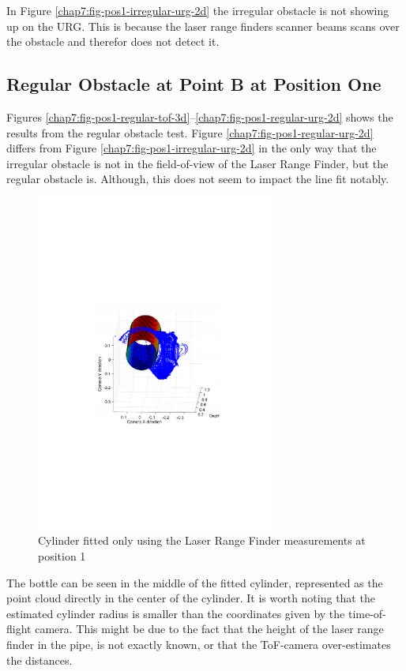 In Figure \ref{chap7:fig-pos1-irregular-urg-2d} the irregular obstacle is not showing up
on the URG. This is because the laser range finders scanner beams scans over the obstacle
and therefor does not detect it. 


\subsection{Regular Obstacle at Point B at Position One}
Figures \ref{chap7:fig-pos1-regular-tof-3d}--\ref{chap7:fig-pos1-regular-urg-2d} shows the
results from the regular obstacle test. Figure \ref{chap7:fig-pos1-regular-urg-2d} differs
from Figure \ref{chap7:fig-pos1-irregular-urg-2d} in the only way that the irregular
obstacle is not in the field-of-view of the Laser Range Finder, but the regular obstacle
is. Although, this does not seem to impact the line fit notably. 
\begin{figure}[htbp]
    \centering
    \includegraphics[width=0.7\textwidth]{pics/pos1-regular-urg-3d}
    \caption{Cylinder fitted only using the Laser Range Finder measurements at position 1}
    \label{chap7:fig-pos1-regular-urg-3d}
\end{figure}
The bottle can be seen in the middle of the fitted cylinder, represented as the point
cloud directly in the center of the cylinder. It is worth noting that the estimated
cylinder radius is smaller than the coordinates given by the time-of-flight camera. This
might be due to the fact that the height of the laser range finder in the pipe, is not
exactly known, or that the ToF-camera over-estimates the distances. 

